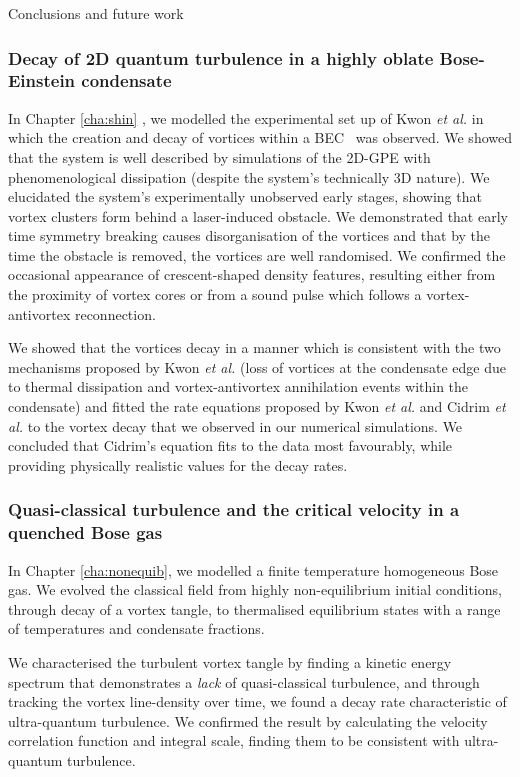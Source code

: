 \begin{chapter}{\label{cha:conc}Conclusions and future work}
\subsubsection{Decay of 2D quantum turbulence in a highly oblate Bose-Einstein condensate}
In Chapter \ref{cha:shin} , we modelled the experimental set up of Kwon {\it et al.} in which the creation and decay of vortices within a BEC~\citep{kwon_moon_14} was observed. We showed that the system is well described by simulations of the 2D-GPE with phenomenological dissipation (despite the system's technically 3D nature). We elucidated the system's experimentally unobserved early stages, showing that vortex clusters form behind a laser-induced obstacle. We demonstrated that early time symmetry breaking causes disorganisation of the vortices and that by the time the obstacle is removed, the vortices are well randomised. We confirmed the occasional appearance of crescent-shaped density features, resulting either from the proximity of vortex cores or from a sound pulse which follows a vortex-antivortex reconnection.

We showed that the vortices decay in a manner which is consistent with the two mechanisms proposed by Kwon {\it et al.} (loss of vortices at the condensate edge due to thermal dissipation and vortex-antivortex annihilation events within the condensate) and fitted the rate equations proposed by Kwon {\it et al.} and Cidrim {\it et al.} to the vortex decay that we observed in our numerical simulations. We concluded that Cidrim's equation fits to the data most favourably, while providing physically realistic values for the decay rates.

\subsubsection{Quasi-classical turbulence and the critical velocity in a quenched Bose gas}
In Chapter \ref{cha:nonequib}, we modelled a finite temperature homogeneous Bose gas. We evolved the classical field from highly non-equilibrium initial conditions, through decay of a vortex tangle, to thermalised equilibrium states with a range of temperatures and condensate fractions.

We characterised the turbulent vortex tangle by finding a kinetic energy spectrum that demonstrates a {\it lack} of quasi-classical turbulence, and through tracking the vortex line-density over time, we found a decay rate characteristic of ultra-quantum turbulence. We confirmed the result by calculating the velocity correlation function and integral scale, finding them to be consistent with ultra-quantum turbulence.


\end{chapter}
